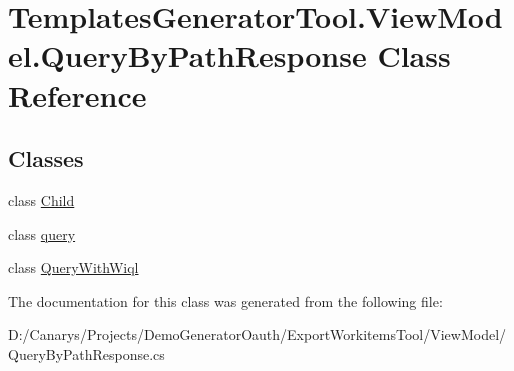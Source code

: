 \hypertarget{class_templates_generator_tool_1_1_view_model_1_1_query_by_path_response}{}\section{Templates\+Generator\+Tool.\+View\+Model.\+Query\+By\+Path\+Response Class Reference}
\label{class_templates_generator_tool_1_1_view_model_1_1_query_by_path_response}
\subsection*{Classes}
\begin{DoxyCompactItemize}
\item 
class \mbox{\hyperlink{class_templates_generator_tool_1_1_view_model_1_1_query_by_path_response_1_1_child}{Child}}
\item 
class \mbox{\hyperlink{class_templates_generator_tool_1_1_view_model_1_1_query_by_path_response_1_1query}{query}}
\item 
class \mbox{\hyperlink{class_templates_generator_tool_1_1_view_model_1_1_query_by_path_response_1_1_query_with_wiql}{Query\+With\+Wiql}}
\end{DoxyCompactItemize}


The documentation for this class was generated from the following file\+:\begin{DoxyCompactItemize}
\item 
D\+:/\+Canarys/\+Projects/\+Demo\+Generator\+Oauth/\+Export\+Workitems\+Tool/\+View\+Model/Query\+By\+Path\+Response.\+cs\end{DoxyCompactItemize}
